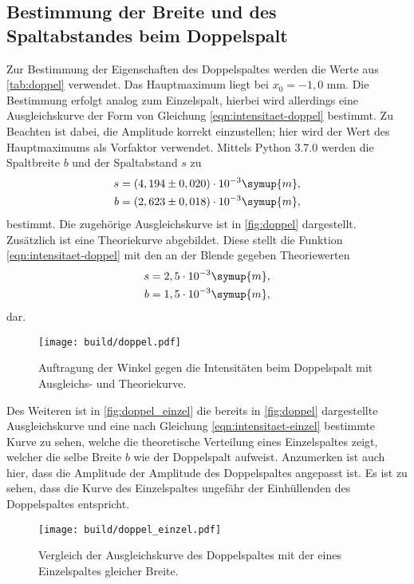 \subsection{Bestimmung der Breite und des Spaltabstandes beim Doppelspalt}
    Zur Bestimmung der Eigenschaften des Doppelspaltes werden die Werte aus \autoref{tab:doppel} verwendet. Das Hauptmaximum liegt bei 
    $x_0 = -1,0$ mm. Die Bestimmung erfolgt analog zum Einzelspalt, hierbei wird allerdings eine Ausgleichskurve der Form von Gleichung \eqref{eqn:intensitaet-doppel}
    bestimmt. Zu Beachten ist dabei, die Amplitude korrekt einzustellen; hier wird der Wert des Hauptmaximums als Vorfaktor verwendet.
    Mittels Python 3.7.0 werden die Spaltbreite $b$ und der Spaltabstand $s$ zu 
    \begin{align}
        s &= (4,194 \pm 0,020) \cdot 10^{-3} \symup{m}, \\
        b &= (2,623 \pm 0,018) \cdot 10^{-3} \symup{m},
    \end{align}
    bestimmt. Die zugehörige Ausgleichskurve ist in \autoref{fig:doppel} dargestellt. Zusätzlich ist eine Theoriekurve abgebildet. Diese 
    stellt die Funktion \eqref{eqn:intensitaet-doppel} mit den an der Blende gegeben Theoriewerten
    \begin{align}
        s &= 2,5 \cdot 10^{-3} \symup{m}, \\
        b &= 1,5 \cdot 10^{-3} \symup{m},
    \end{align}
    dar. 
    
    \begin{figure}
        \centering
        \texttt{[image: build/doppel.pdf]}
        \caption{Auftragung der Winkel gegen die Intensitäten beim Doppelspalt mit Ausgleichs- und Theoriekurve.}
        \label{fig:doppel}
    \end{figure}

    
    Des Weiteren ist in \autoref{fig:doppel_einzel} die bereits in \autoref{fig:doppel} dargestellte Ausgleichskurve und eine nach Gleichung
    \eqref{eqn:intensitaet-einzel} bestimmte Kurve zu sehen, welche die theoretische Verteilung eines Einzelspaltes zeigt, welcher die selbe 
    Breite $b$ wie der Doppelspalt aufweist. Anzumerken ist auch hier, dass die Amplitude der Amplitude des Doppelspaltes angepasst ist.
    Es ist zu sehen, dass die Kurve des Einzelspaltes ungefähr der Einhüllenden des Doppelspaltes entspricht.

    \begin{figure}
        \centering
        \texttt{[image: build/doppel\_einzel.pdf]}
        \caption{Vergleich der Ausgleichskurve des Doppelspaltes mit der eines Einzelspaltes gleicher Breite.}
        \label{fig:doppel_einzel}
    \end{figure}


    
